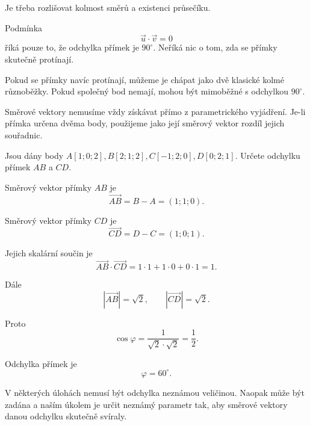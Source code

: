 \begin{remark}
    \label{rem:Perpendicular_directions_skew_lines}
    Je třeba rozlišovat kolmost směrů a existenci průsečíku.

    Podmínka
    \[
        \vec{u}\cdot\vec{v}=0
    \]
    říká pouze to, že odchylka přímek je $90^\circ$. Neříká nic o tom,
    zda se přímky skutečně protínají.

    Pokud se přímky navíc protínají, můžeme je chápat jako dvě
    klasické kolmé různoběžky. Pokud společný bod nemají, mohou být
    mimoběžné s odchylkou $90^\circ$.
\end{remark}

Směrové vektory nemusíme vždy získávat přímo z parametrického
vyjádření. Je-li přímka určena dvěma body, použijeme jako její směrový
vektor rozdíl jejich souřadnic.

\begin{example}
    \label{exa:Angle_lines_defined_by_points_space}

    Jsou dány body $A[1;0;2], B[2;1;2],C[-1;2;0],D[0;2;1]$.
    Určete odchylku přímek $AB$ a $CD$.

    Směrový vektor přímky $AB$ je
    \[
        \overrightarrow{AB}
        =
        B-A
        =
        (1;1;0).
    \]

    Směrový vektor přímky $CD$ je
    \[
        \overrightarrow{CD}
        =
        D-C
        =
        (1;0;1).
    \]

    Jejich skalární součin je
    \[
        \overrightarrow{AB}\cdot\overrightarrow{CD}
        =
        1\cdot1+1\cdot0+0\cdot1
        =
        1.
    \]

    Dále
    \[
        |\overrightarrow{AB}|=\sqrt2,
        \qquad
        |\overrightarrow{CD}|=\sqrt2.
    \]

    Proto
    \[
        \cos\varphi
        =
        \frac{1}{\sqrt2\cdot\sqrt2}
        =
        \frac12.
    \]

    Odchylka přímek je
    \[
        \varphi=60^\circ.
    \]
\end{example}

V některých úlohách nemusí být odchylka neznámou veličinou. Naopak
může být zadána a naším úkolem je určit neznámý parametr tak, aby
směrové vektory danou odchylku skutečně svíraly.

